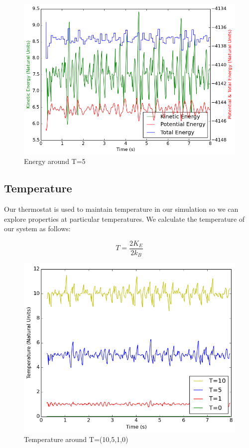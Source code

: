 \documentclass[10pt]{article}
\newcommand{\beq}{\begin{equation}}
\newcommand{\eeq}{\end{equation}}
\begin{document}
\begin{figure}[ht]
\centering
\begin{minipage}{.45\textwidth}
\centering
\includegraphics[width=1 \linewidth]{figures/energy2.png}
\caption{Energy around T=5}
\label{fig:figure4}
\end{minipage}\hfill
\end{figure}

\subsection{Temperature}
Our thermostat is used to maintain temperature in our simulation so we can explore properties at particular temperatures.  We calculate the temperature of our system as follows:

\beq
\label{eqn:equation10}
T = \frac{2K_E}{2k_B}
\eeq

\begin{figure}[H]
\centering
\begin{minipage}{.45\textwidth}
\centering
\includegraphics[width=1 \linewidth]{figures/temp.png}
\caption{Temperature around T=(10,5,1,0)}
\label{fig:figure5}
\end{minipage}\hfill
\end{figure}
\end{document}
